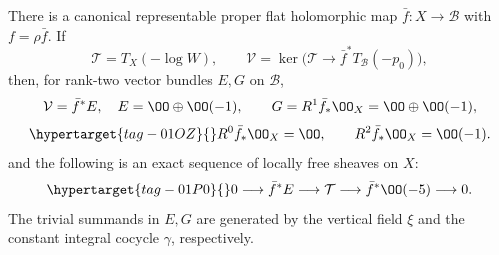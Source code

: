 \begin{proposition}\hypertarget{tag-01SN}{}\label{inv:D1.2}

There is a canonical representable proper flat holomorphic map
$\bar f:X\to\mathcal B$ with $f=\rho\bar f$. If
\[
 \mathcal T=T_X(-\log W),\qquad
 \mathcal V=\ker\bigl(\mathcal T\to
                   \bar f^*T_{\mathcal B}(-p_0)\bigr),
\]
then, for rank-two vector bundles $E,G$ on $\mathcal B$,
\begin{equation}
 \mathcal V=\bar f^*E,\quad E=\OO\oplus\OO(-1),\qquad
 G=R^1\bar f_*\OO_X=\OO\oplus\OO(-1),
\label{pub:I:eq:D-2}
\end{equation}
\begin{equation}
 \hypertarget{tag-01OZ}{}\label{fam:eq:ab-direct-images}
R^0\bar f_*\OO_X=\OO,\qquad R^2\bar f_*\OO_X=\OO(-1).
\end{equation}
and the following is an exact sequence of locally free sheaves on $X$:
\begin{equation}
 \hypertarget{tag-01P0}{}\label{fam:eq:ab-log-tangent}
0\longrightarrow\bar f^*E\longrightarrow\mathcal T
 \longrightarrow\bar f^*\OO(-5)\longrightarrow0.       
\end{equation}
The trivial summands in $E,G$ are generated by the vertical field $\xi$
and the constant integral cocycle $\gamma$, respectively.
\end{proposition}



